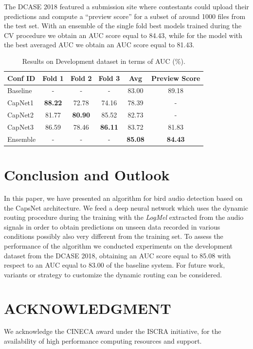 The DCASE 2018 featured a submission site where contestants could upload their predictions and compute a ``preview score'' for a subset of around 1000 files from the test set. With an ensemble of the single fold best models trained during the CV procedure we obtain an AUC score equal to 84.43, while for the model with the best averaged AUC we obtain an AUC score equal to 81.43.


\begin{table}[b]
	\centering
	\begin{tabular}{|l|c|c|c|c|c|}
		\hline
		Conf ID & Fold 1 & Fold 2	& Fold 3 & Avg & Preview Score \\
		\hline
		Baseline &	-	&	-		&	-	& 83.00 &  89.18		\\
		\hline
		CapNet1	&  \textbf{88.22} & 72.78	& 74.16	& 78.39 & -	\\
		CapNet2	&  81.77 &  \textbf{80.90} 	& 85.52	& 82.73	& 	- \\
		CapNet3	&  86.59 & 78.46	&  \textbf{86.11}	&  83.72 				& 81.83  \\
		Ensemble &	-	 & 		-	&		-			&		\textbf{85.08}  & \textbf{84.43} \\
		\hline		
	\end{tabular}
	\caption{Results on Development dataset in terms of AUC (\%).}
	\label{tab:results}
\end{table}


\section{Conclusion and Outlook}
\label{sec:conclusion}

In this paper, we have presented an algorithm for bird audio detection based on the CapsNet architecture. We feed a deep neural network which uses the dynamic routing procedure during the training with the \textit{LogMel} extracted from the audio signals in order to obtain predictions on unseen data recorded in various conditions possibly also very different from the training set. 
To assess the performance of the algorithm we conducted experiments on the development dataset from the DCASE 2018, obtaining an AUC score equal to 85.08 with respect to an AUC equal to 83.00 of the baseline system.
For future work, variants \cite{hinton2018matrix} or strategy to customize the dynamic routing can be considered.

\section{ACKNOWLEDGMENT}
\label{sec:ack}

We acknowledge the CINECA award under the ISCRA initiative, for the availability of high performance computing resources and support.
